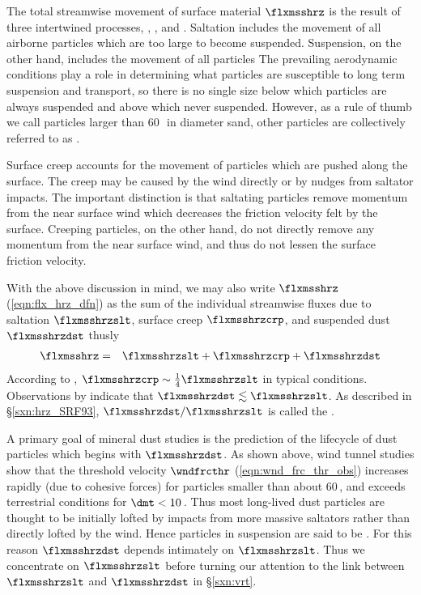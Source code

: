 \documentclass[12pt,twoside]{book}
\begin{document}
The total streamwise movement of surface material $\flxmsshrz$ is the
result of three intertwined processes, ,
, and . 
Saltation includes the movement of all airborne particles which are
too large to become suspended.
Suspension, on the other hand, includes the movement of all particles 
The prevailing aerodynamic conditions play a role in determining what
particles are susceptible to long term suspension and transport,
so there is no single size below which particles are always suspended
and above which never suspended.
However, as a rule of thumb we call particles larger than 60\,\um\ in
diameter sand, other particles are collectively referred to as
.  

Surface creep accounts for the movement of particles which are pushed
along the surface.
The creep may be caused by the wind directly or by nudges from
saltator impacts.
The important distinction is that saltating particles remove momentum
from the near surface wind which decreases the friction velocity felt
by the surface. 
Creeping particles, on the other hand, do not directly remove any
momentum from the near surface wind, and thus do not lessen the 
surface friction velocity.

With the above discussion in mind, we may also write $\flxmsshrz$ 
(\ref{eqn:flx_hrz_dfn}) as the sum of the individual streamwise fluxes
due to saltation $\flxmsshrzslt$, surface creep $\flxmsshrzcrp$, and
suspended dust $\flxmsshrzdst$ thusly 
\begin{eqnarray}
\flxmsshrz & = & \flxmsshrzslt + \flxmsshrzcrp + \flxmsshrzdst
\label{eqn:flx_slt_crp}
\end{eqnarray}
According to \cite{Bag41}, 
$\flxmsshrzcrp \sim \frac{1}{4} \flxmsshrzslt$ in typical conditions.
Observations by \cite{SRF93} indicate that 
$\flxmsshrzdst \lesssim \flxmsshrzslt$.
As described in \S\ref{sxn:hrz_SRF93},
$\flxmsshrzdst/\flxmsshrzslt$ is called the 
.

A primary goal of mineral dust studies is the prediction of the
lifecycle of dust particles which begins with $\flxmsshrzdst$.
As shown above, wind tunnel studies \cite[e.g.,][]{IvW82} show that
the threshold velocity $\wndfrcthr$ (\ref{eqn:wnd_frc_thr_obs})
increases rapidly (due to cohesive forces) for particles smaller than
about 60\,\um, and exceeds terrestrial conditions for $\dmt < 10$\,\um.
Thus most long-lived dust particles are thought to be initially lofted
by impacts from more massive saltators rather than directly lofted by
the wind. 
Hence particles in suspension are said to be .  
For this reason $\flxmsshrzdst$ depends intimately on $\flxmsshrzslt$.  
Thus we concentrate on $\flxmsshrzslt$ before turning our attention to
the link between $\flxmsshrzslt$ and $\flxmsshrzdst$ in \S\ref{sxn:vrt}.
\end{document}
